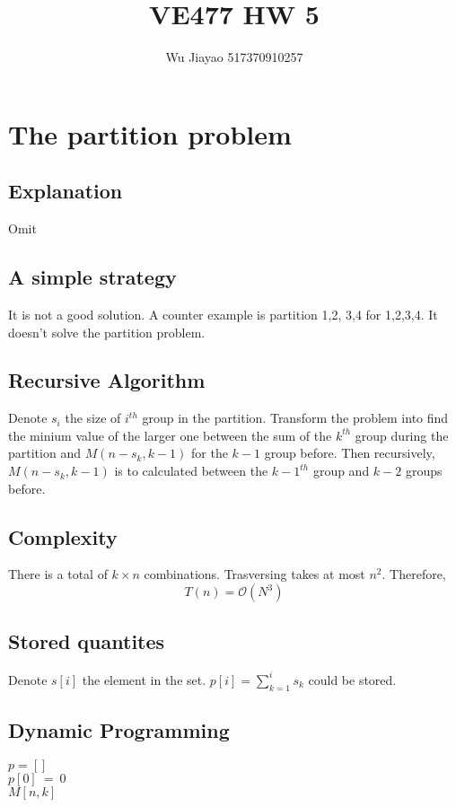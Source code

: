 \documentclass[12pt,a4paper]{article}
\title{VE477 HW 5}
\author{Wu Jiayao 517370910257}
\theoremstyle{definition}
\begin{document}
\maketitle
\section{The partition problem}
\subsection{Explanation}
Omit
\subsection{A simple strategy}
It is not a good solution. A counter example is partition {1,2}, {3,4} for {1,2,3,4}. It doesn't solve the partition problem.
\subsection{Recursive Algorithm}
Denote $s_i$ the size of $i^{th}$ group in the partition. Transform the problem into find the minium value of the larger one between the sum of the $k^{th}$ group during the partition and $M(n-s_k,k-1)$ for the $k-1$ group before. Then recursively, $M(n-s_k,k-1)$ is to calculated between the $k-1^{th}$ group and $k-2$ groups before.
\subsection{Complexity}
There is a total of $k \times n$ combinations. Trasversing takes at most $n^2$. Therefore,
$$
T(n) = \mathcal{O}(N^3)
$$
\subsection{Stored quantites}
Denote $s[i]$ the element in the set. $p[i]=\sum_{k=1}^{i}s_k$ could be stored. 
\subsection{Dynamic Programming}
\begin{algorithm}[H]
    $p = []$ \\
    $p[0]\ =\ 0$ \\
    \Return $M[n,k]$ 
\end{algorithm}
\end{document}
